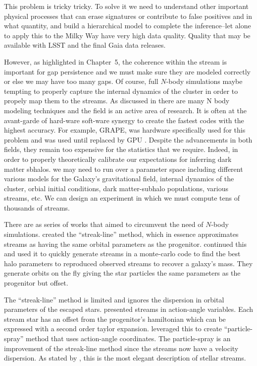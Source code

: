         This problem is tricky tricky. To solve it we need to understand other important physical processes that can erase signatures or contribute to false positives and in what quantity, and build a hierarchical model to complete the inference--let alone to apply this to the Milky Way have very high data quality. Quality that may be available with LSST and the final Gaia data releases.

        However, as highlighted in Chapter~5, the coherence within the stream is important for gap persistence and we must make sure they are modeled correctly or else we may have too many gaps. Of course, full $N$-body simulations maybe tempting to properly capture the internal dynamics of the cluster in order to propely map them to the streams. As discussed in \citet{2018ComAC...5....2V,2023LRCA....9....3S} there are many N body modeling techniques and the field is an active area of research. It is often at the avant-garde of hard-ware soft-ware synergy to create the fastest codes with the highest accuracy. For example, GRAPE, was hardware specifically used for this problem and was used until replaced by GPU \citep{2012MNRAS.424..545N,2015MNRAS.450.4070W}. Despite the advancements in both fields, they remain too expensive for the statistics that we require. Indeed, in order to properly theoretically calibrate our expectations for inferring dark matter sbhalos. we may need to run over a parameter space including different various models for the Galaxy's gravitational field, internal dynamics of the cluster, orbial initial conditions, dark matter-subhalo populations, various streams, etc. We can design an experiment in which we must compute tens of thousands of streams. 

        There are as series of works that aimed to circumvent the need of $N$-body simulations. \citet{2012MNRAS.420.2700K} created the ``streak-line'' method, which in essence approximates streams as having the same orbital parameters as the progenitor. \citet{2014ApJ...795...94B} continued this and used it to quickly generate streams in a monte-carlo code to find the best halo parameters to reproduced observed streams to recover a galaxy's mass. They generate orbits on the fly giving the star particles the same parameters as the progenitor but offset. 

        The ``streak-line'' method is limited and ignores the dispersion in orbital parameters of the escaped stars. \citet{2011MNRAS.413.1852E} presented streams in action-angle variables. Each stream star has an offset from the progenitor's hamiltonian which can be expressed with a second order taylor expansion.  \citet{2014ApJ...795...95B} leveraged this to create ``particle-spray'' method that uses action-angle coordinates. The particle-spray is an improvement of the streak-line method since the streams now have a velocity dispersion. As stated by \citet{2015MNRAS.452..301F}, this is the most elegant description of stellar streams. 

